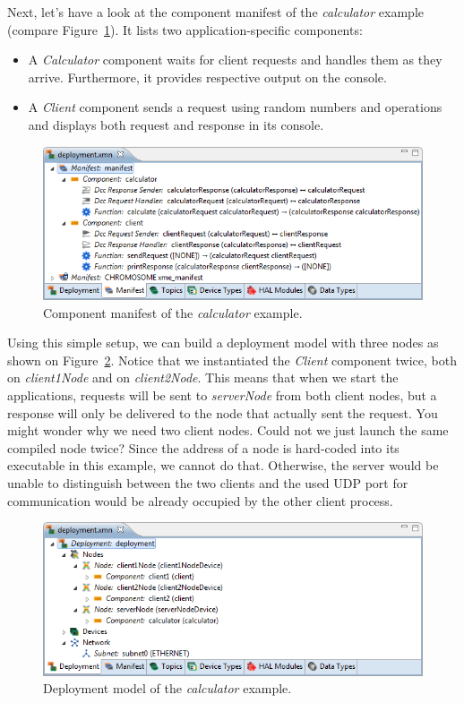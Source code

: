Next, let's have a look at the component manifest of the \emph{calculator} example (compare Figure~\ref{fig:xmt_calculator_manifest}).
It lists two application-specific components:
\begin{itemize}
	\item A \emph{Calculator} component waits for client requests and handles them as they arrive.
		Furthermore, it provides respective output on the console.
	
	\item A \emph{Client} component sends a request using random numbers and operations and displays both request and response in its console.
\end{itemize}
%
\begin{figure}[htpb]
	\centering
	\includegraphics[scale=0.75]{figures/xmt_calculator_manifest.png}
	\caption{Component manifest of the \emph{calculator} example.}
	\label{fig:xmt_calculator_manifest}
\end{figure}
%
Using this simple setup, we can build a deployment model with three nodes as shown on Figure~\ref{fig:xmt_calculator_deployment}.
Notice that we instantiated the \emph{Client} component twice, both on \emph{client1Node} and on \emph{client2Node}.
This means that when we start the applications, requests will be sent to \emph{serverNode} from both client nodes,
but a response will only be delivered to the node that actually sent the request.
%
You might wonder why we need two client nodes. Could not we just launch the same compiled node twice?
Since the address of a node is hard-coded into its executable in this example, we cannot do that.
Otherwise, the server would be unable to distinguish between the two clients
and the used UDP port for communication would be already occupied by the other client process.

\begin{figure}[htpb]
	\centering
	\includegraphics[scale=0.75]{figures/xmt_calculator_deployment.png}
	\caption{Deployment model of the \emph{calculator} example.}
	\label{fig:xmt_calculator_deployment}
\end{figure}


